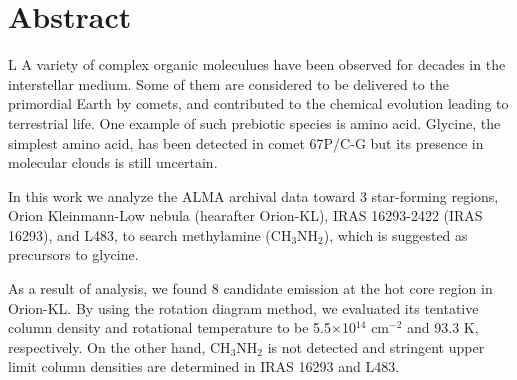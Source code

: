 \chapter*{Abstract}

\singlespacing
\doublespacing
L
A variety of complex organic moleculues have been observed for decades in the interstellar medium.
Some of them are considered to be delivered to the primordial Earth by comets, 
and contributed to the chemical evolution leading to terrestrial life.
One example of such prebiotic species is amino acid. Glycine, the simplest amino acid, 
has been detected in comet 67P/C-G but its presence in molecular clouds is still uncertain.

In this work we analyze the ALMA archival data toward 3 star-forming regions, 
Orion Kleinmann-Low nebula (hearafter Orion-KL), IRAS 16293-2422 (IRAS 16293), and L483,
to search methylamine (CH$_3$NH$_2$), which is suggested as precursors to glycine. 

As a result of analysis, we found 8 candidate emission at the hot core region in Orion-KL.
By using the rotation diagram method, we evaluated its tentative column density 
and rotational temperature to be 5.5$\times$10$^{14}$ cm$^{-2}$ and 93.3 K, respectively. 
On the other hand, CH$_3$NH$_2$ is not detected and stringent upper limit column densities
are determined in IRAS 16293 and L483.